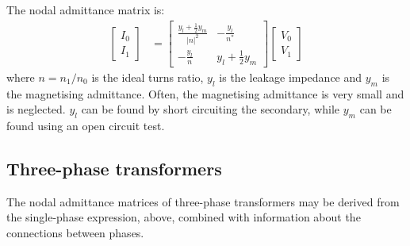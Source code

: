\documentclass[11pt]{article}
\begin{document}
The nodal admittance matrix is:
\begin{align}
\begin{bmatrix}I_0 \\ I_1 \end{bmatrix} &= 
\begin{bmatrix}\frac{y_l + \frac{1}{2}y_m}{|n|^2} & -\frac{y_l}{n^*} \\ -\frac{y_l}{n} & y_l + \frac{1}{2}y_m\end{bmatrix}
\begin{bmatrix}V_0 \\ V_1 \end{bmatrix}
\end{align}
where $n = n_1/n_0$ is the ideal turns ratio, $y_l$ is the leakage impedance and $y_m$ is the magnetising admittance. Often, the magnetising admittance is very small and is neglected. $y_l$ can be found by short circuiting the secondary, while $y_m$ can be found using an open circuit test.

\subsection{Three-phase transformers}
The nodal admittance matrices of three-phase transformers may be derived from the single-phase expression, above, combined with information about the connections between phases.
\end{document}
